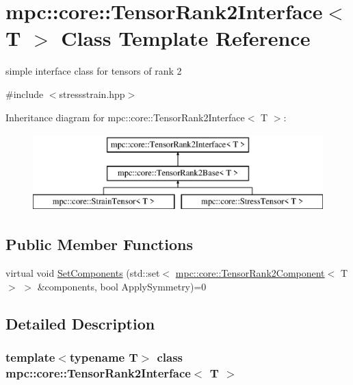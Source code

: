 \hypertarget{structmpc_1_1core_1_1_tensor_rank2_interface}{}\section{mpc\+:\+:core\+:\+:Tensor\+Rank2\+Interface$<$ T $>$ Class Template Reference}
\label{structmpc_1_1core_1_1_tensor_rank2_interface}


simple interface class for tensors of rank 2  




{\ttfamily \#include $<$stressstrain.\+hpp$>$}

Inheritance diagram for mpc\+:\+:core\+:\+:Tensor\+Rank2\+Interface$<$ T $>$\+:\begin{figure}[H]
\begin{center}
\leavevmode
\includegraphics[height=3.000000cm]{structmpc_1_1core_1_1_tensor_rank2_interface}
\end{center}
\end{figure}
\subsection*{Public Member Functions}
\begin{DoxyCompactItemize}
\item 
virtual void \mbox{\hyperlink{structmpc_1_1core_1_1_tensor_rank2_interface_a7d220631fe32f06ec52e5724873a00d9}{Set\+Components}} (std\+::set$<$ \mbox{\hyperlink{namespacempc_1_1core_a467e1fa517a8c269b033fef3aa281360}{mpc\+::core\+::\+Tensor\+Rank2\+Component}}$<$ T $>$ $>$ \&components, bool Apply\+Symmetry)=0
\end{DoxyCompactItemize}


\subsection{Detailed Description}
\subsubsection*{template$<$typename T$>$\newline
class mpc\+::core\+::\+Tensor\+Rank2\+Interface$<$ T $>$}

